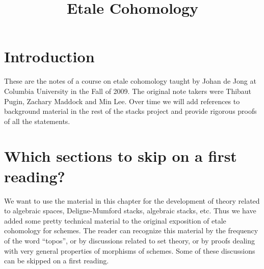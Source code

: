 

%


\title{Etale Cohomology}


\maketitle

\label{section-phantom}

\tableofcontents


\section{Introduction}
\label{section-introduction}

\noindent
These are the notes of a course on etale cohomology taught by Johan de Jong
at Columbia University in the Fall of 2009. The original note takers were
Thibaut Pugin, Zachary Maddock and Min Lee. Over time we will add references
to background material in the rest of the stacks project and provide rigorous
proofs of all the statements.



\section{Which sections to skip on a first reading?}
\label{section-skip}

\noindent
We want to use the material in this chapter for the development of
theory related to algebraic spaces, Deligne-Mumford stacks, algebraic stacks,
etc. Thus we have added some pretty technical material to the original
exposition of etale cohomology for schemes. The reader can recognize this
material by the frequency of the word ``topos'', or by discussions related
to set theory, or by proofs dealing with very general properties of morphisms
of schemes. Some of these discussions can be skipped on a first reading.

